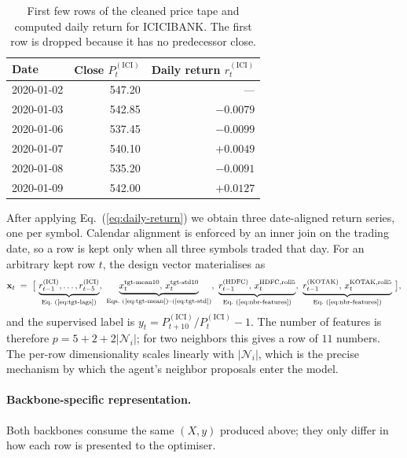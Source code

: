\documentclass[12pt,a4paper,titlepage]{article}
\begin{document}
\begin{table}[htbp]
\centering
\small
\caption{First few rows of the cleaned price tape and computed daily return for ICICIBANK. The first row is dropped because it has no predecessor close.}
\label{tab:worked-example-tape}
\begin{tabular}{lrr}
\toprule
Date & Close \(P_t^{(\text{ICI})}\) & Daily return \(r_t^{(\text{ICI})}\) \\
\midrule
2020-01-02 & 547.20 & --- \\
2020-01-03 & 542.85 & $-0.0079$ \\
2020-01-06 & 537.45 & $-0.0099$ \\
2020-01-07 & 540.10 & $+0.0049$ \\
2020-01-08 & 535.20 & $-0.0091$ \\
2020-01-09 & 542.00 & $+0.0127$ \\
\bottomrule
\end{tabular}
\end{table}

After applying Eq.~(\ref{eq:daily-return}) we obtain three date-aligned return series, one per symbol. Calendar alignment is enforced by an inner join on the trading date, so a row is kept only when all three symbols traded that day. For an arbitrary kept row \(t\), the design vector materialises as
\[
\mathbf{x}_t \;=\;
\big[\,
\underbrace{r_{t-1}^{(\text{ICI})},\ldots,r_{t-5}^{(\text{ICI})}}_{\text{Eq.~(\ref{eq:tgt-lags})}},\
\underbrace{x_t^{\text{tgt-mean10}},\,x_t^{\text{tgt-std10}}}_{\text{Eqs.~(\ref{eq:tgt-mean})--(\ref{eq:tgt-std})}},\
\underbrace{r_{t-1}^{(\text{HDFC})},\,x_t^{\text{HDFC,roll5}}}_{\text{Eq.~(\ref{eq:nbr-features})}},\
\underbrace{r_{t-1}^{(\text{KOTAK})},\,x_t^{\text{KOTAK,roll5}}}_{\text{Eq.~(\ref{eq:nbr-features})}}
\,\big],
\]
and the supervised label is
\(
y_t = P_{t+10}^{(\text{ICI})}/P_t^{(\text{ICI})}-1.
\)
The number of features is therefore \(p = 5 + 2 + 2|\mathcal{N}_i|\); for two neighbors this gives a row of \(11\) numbers. The per-row dimensionality scales linearly with \(|\mathcal{N}_i|\), which is the precise mechanism by which the agent's neighbor proposals enter the model.

\paragraph{Backbone-specific representation.}
Both backbones consume the same \((X,y)\) produced above; they only differ in how each row is presented to the optimiser.
\end{document}
